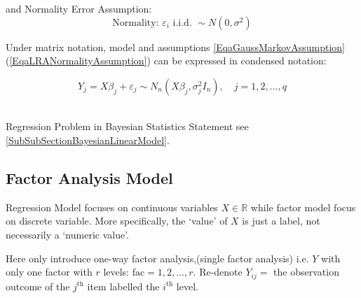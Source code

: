 and Normality Error Assumption: 
\begin{equation}\label{EqaLRANormalityAssumption}
    \text{Normality: }\varepsilon _i \text{ i.i.d. }\sim N(0,\sigma ^2) 
\end{equation}

    Under matrix notation, model and assumptions \autoref{EqaGaussMarkovAssumption} (\autoref{EqaLRANormalityAssumption}) can be expressed in condensed notation:

    \begin{equation}
        Y_j=X\beta_j +\varepsilon_j  \sim N_n(X\beta_j ,\sigma_j^2I_n),\quad j=1,2,\ldots,q
    \end{equation}

\\

Regression Problem in Bayesian Statistics Statement see \autoref{SubSubSectionBayesianLinearModel}.

\subsection{Factor Analysis Model}\label{SubSubSectionFactorAnalysisModelIntroduction}
    Regression Model focuses on continuous variables $ X\in\mathbb{R} $ while factor model focus on discrete variable. More specifically, the `value' of $ X $ is just a label, not necessarily a `numeric value'.

    Here only introduce one-way factor analysis,(single factor analysis) i.e. $ Y $ with only one factor with $ r $ levels: $ \mathrm{fac} =1,2,\ldots,r $. Re-denote $ Y_{ij}= $ the observation outcome of the $ j^\mathrm{th}  $ item labelled the $ i^\mathrm{th}  $ level.

